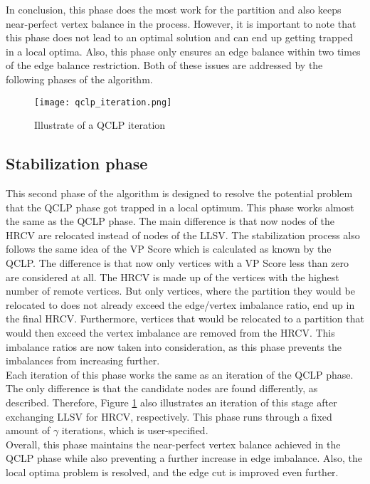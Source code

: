 \documentclass[acmsmall,nonacm,screen,review]{acmart}
\begin{document}
In conclusion, this phase does the most work for the partition and also keeps near-perfect vertex balance in the process. However, it is important to note that this phase does not lead to an optimal solution and can end up getting trapped in a local optima. Also, this phase only ensures an edge balance within two times of the edge balance restriction. Both of these issues are addressed by the following phases of the algorithm.
\begin{figure}[t]
\centering
\caption{Illustrate of a QCLP iteration}
\label{iteration}
\texttt{[image: qclp\_iteration.png]}
\end{figure}
\subsection{Stabilization phase}
This second phase of the algorithm is designed to resolve the potential problem that the QCLP phase got trapped in a local optimum. This phase works almost the same as the QCLP phase. The main difference is that now nodes of the HRCV are relocated instead of nodes of the LLSV. The stabilization process also follows the same idea of the VP Score which is calculated as known by the QCLP. The difference is that now only vertices with a VP Score less than zero are considered at all. The HRCV is made up of the vertices with the highest number of remote vertices. But only vertices, where the partition they would be relocated to does not already exceed the edge/vertex imbalance ratio, end up in the final HRCV. Furthermore, vertices that would be relocated to a partition that would then exceed the vertex imbalance are removed from the HRCV. This imbalance ratios are now taken into consideration, as this phase prevents the imbalances from increasing further. \\
Each iteration of this phase works the same as an iteration of the QCLP phase. The only difference is that the candidate nodes are found differently, as described. Therefore, Figure \ref{iteration} also illustrates an iteration of this stage after exchanging LLSV for HRCV, respectively. This phase runs through a fixed amount of $\gamma$ iterations, which is user-specified. \\
Overall, this phase maintains the near-perfect vertex balance achieved in the QCLP phase while also preventing a further increase in edge imbalance. Also, the local optima problem is resolved, and the edge cut is improved even further.
\end{document}
